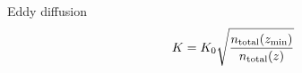 Eddy diffusion 
\begin{equation}
K = K_0  \sqrt{\frac{n_\text{total}(z_\text{min})}{n_\text{total}(z)}}
\label{Titan:eddy_diff}
\end{equation}
